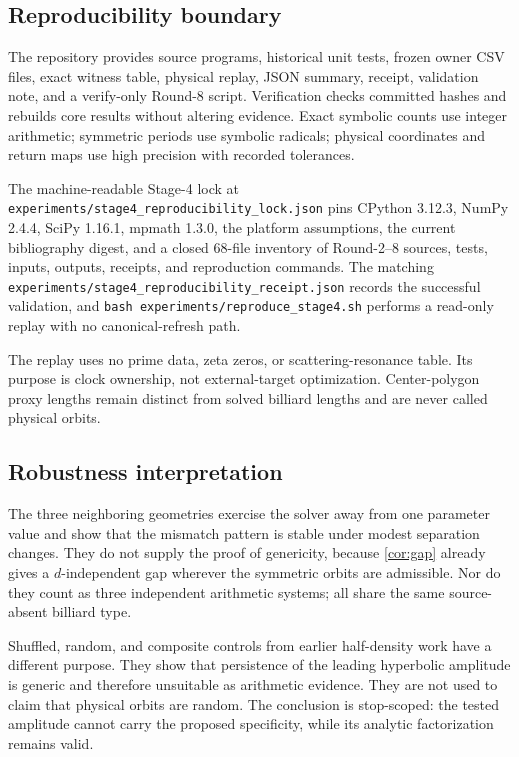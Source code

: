 \documentclass[11pt,a4paper]{article}
\theoremstyle{definition}
\theoremstyle{remark}
\begin{document}
\subsection{Reproducibility boundary}

The repository provides source programs, historical unit tests, frozen owner CSV files, exact witness table, physical replay, JSON summary, receipt, validation note, and a verify-only Round-8 script. Verification checks committed hashes and rebuilds core results without altering evidence. Exact symbolic counts use integer arithmetic; symmetric periods use symbolic radicals; physical coordinates and return maps use high precision with recorded tolerances.

The machine-readable Stage-4 lock at \texttt{experiments/stage4\_reproducibility\_lock.json} pins CPython 3.12.3, NumPy 2.4.4, SciPy 1.16.1, mpmath 1.3.0, the platform assumptions, the current bibliography digest, and a closed 68-file inventory of Round-2--8 sources, tests, inputs, outputs, receipts, and reproduction commands. The matching \texttt{experiments/stage4\_reproducibility\_receipt.json} records the successful validation, and \texttt{bash experiments/reproduce\_stage4.sh} performs a read-only replay with no canonical-refresh path.

The replay uses no prime data, zeta zeros, or scattering-resonance table. Its purpose is clock ownership, not external-target optimization. Center-polygon proxy lengths remain distinct from solved billiard lengths and are never called physical orbits.

\subsection{Robustness interpretation}

The three neighboring geometries exercise the solver away from one parameter value and show that the mismatch pattern is stable under modest separation changes. They do not supply the proof of genericity, because \cref{cor:gap} already gives a \(d\)-independent gap wherever the symmetric orbits are admissible. Nor do they count as three independent arithmetic systems; all share the same source-absent billiard type.

Shuffled, random, and composite controls from earlier half-density work have a different purpose. They show that persistence of the leading hyperbolic amplitude is generic and therefore unsuitable as arithmetic evidence. They are not used to claim that physical orbits are random. The conclusion is stop-scoped: the tested amplitude cannot carry the proposed specificity, while its analytic factorization remains valid.
\end{document}

